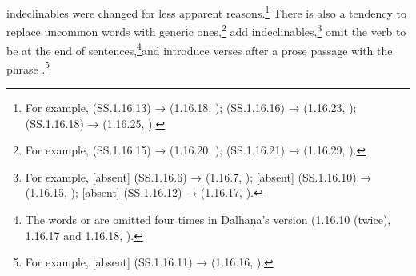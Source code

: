                                     indeclinables were
                                    changed for less apparent reasons.\footnote{For example, 
                                    (SS.1.16.13) →
                                         (1.16.18, \cite[79]{vulgate});  (SS.1.16.16) → 
                                         (1.16.23,
                                        \cite[79]{vulgate});  (SS.1.16.18) →  (1.16.25,
                                        \cite[80]{vulgate}).} There is also a tendency to replace 
                                        uncommon words with
                                        generic ones,\footnote{For example,  
                                        (SS.1.16.15) → 
                                            (1.16.20, \cite[79]{vulgate});  (SS.1.16.21) → 
                                             (1.16.29,
                                            \cite[81]{vulgate}).} add indeclinables,\footnote{For example, 
                                            [absent] 
                                                (SS.1.16.6) →  (1.16.7, \cite[77]{vulgate}); [absent] 
                                                (SS.1.16.10) →
                                                 (1.16.15, \cite[78]{vulgate}); [absent]  
                                                (SS.1.16.12) → 
                                                (1.16.17, \cite[79]{vulgate}).} omit the verb to be at the end 
                                                of
                                                sentences,\footnote{The words  or 
                                                 are omitted four
                                                    times in Ḍalhaṇa's version (1.16.10 (twice), 1.16.17 and 
                                                    1.16.18, \cite[77,
                                                    79]{vulgate}).}and introduce verses after a prose passage 
                                                    with the phrase
                                                    .\footnote{For example, [absent] 
                                                    (SS.1.16.11) →  (1.16.16, \cite[79]{vulgate}).}


